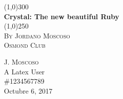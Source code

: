 \documentclass{article}
\begin{document}
\begin{titlepage}
	\begin{center}
	\line(1,0){300}\\
	[0.5cm]
	\huge{\bfseries Crystal: The new beautiful Ruby}\\
	[0.1cm]
	\line(1,0){250}\\
	\textsc{\LARGE By Jordano Moscoso}\\
	\textsc{\Large Osmond Club}\\
	[10cm]
	\end{center}
	\begin{flushright}
	\textsc{\large J. Moscoso}\\
	A Latex User \\
	\#1234567789 \\
	Octubre 6, 2017 \\
	\end{flushright}
\end{titlepage}
\end{document}

